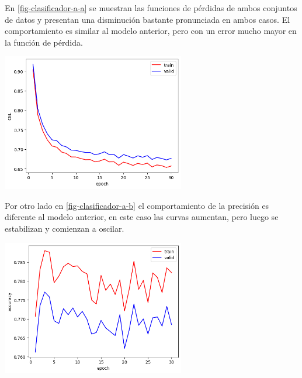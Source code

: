 \documentclass[aps,prl,reprint,groupedaddress]{revtex4-2}
\newenvironment{Figura}
  {\par\medskip\noindent\minipage{\linewidth}}
  {\endminipage\par\medskip}
\begin{document}
En \ref{fig-clasificador-a-a} se muestran las funciones de pérdidas de ambos 
conjuntos de datos y presentan una disminución bastante pronunciada en ambos casos. 
El comportamiento es similar al modelo anterior, pero con un error mucho mayor en 
la función de pérdida.
\begin{Figura}
  \centering
  \includegraphics[width=0.60\textwidth]{figs1/modelo_original_entrenando_solo_clasificadora_a.png}
  \label{fig-clasificador-a-a}
\end{Figura}

Por otro lado en \ref{fig-clasificador-a-b} el comportamiento de la precisión 
es diferente al modelo anterior, en este caso las curvas aumentan, pero luego se
estabilizan y comienzan a oscilar.
\begin{Figura}
  \centering
  \includegraphics[width=0.60\textwidth]{figs1/modelo_original_entrenando_solo_clasificadora_b.png}
  \label{fig-clasificador-a-b}
\end{Figura}
\end{document}
